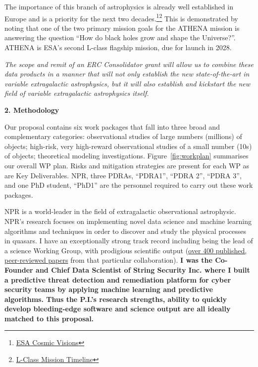 \documentclass[oneside, a4paper, onecolumn, 11pt]{article}
\begin{document}
\smallskip
\smallskip
\noindent
The importance of this branch of astrophysics is already well
established in Europe and is a priority for the next two
decades.\footnote{\href{http://sci.esa.int/cosmic-vision}{ESA Cosmic
Visions}}\footnote{\href{http://sci.esa.int/cosmic-vision/42369-l-class-timeline/}{L-Class
Mission Timeline}} This is demonstrated by noting that one of the two
primary mission goals for the ATHENA mission is answering the question
``How do black holes grow and shape the Universe?''.  ATHENA is ESA's
second L-class flagship mission, due for launch in 2028.

\smallskip
\smallskip
\noindent
{\it The scope and remit of an ERC Consolidator grant will allow us to
combine these data products in a manner that will not only establish
the new state-of-the-art in variable extragalactic astrophysics, but it 
will also establish and kickstart the new field of variable extragalactic
astrophysics itself.}




\medskip
\medskip
\noindent
\large
{\bf{\textcolor{Cerulean}{2. Methodology}}}
\normalsize

\noindent
Our proposal contains six work packages that fall into three broad and
complementary categories: observational studies of large numbers
(millions) of objects; high-risk, very high-reward observational
studies of a small number (10s) of objects; theoretical modeling
investigations. Figure~\ref{fig:workplan} summarises our overall WP
plan. Risks and mitigation strategies are present for each WP as are
Key Deliverables.  NPR, three PDRAs, ``PDRA1'', ``PDRA 2'', ``PDRA
3'', and one PhD student, ``PhD1'' are the personnel required to carry
out these work packages.


\smallskip
\smallskip
\noindent
NPR is a world-leader in the field of extragalactic observational
astrophysic. NPR's research focuses on implementing novel data
science and machine learning algorithms and techniques in order to
discover and study the physical processes in quasars. I have an
exceptionally strong track record including being the lead of a
science Working Group, with prodigious scientific output
(\href{https://tinyurl.com/ycxd8lb6}{over 400 published, peer-reviewed
papers} from that particular collaboration).
{\bf I was the Co-Founder and Chief Data Scientist of String Security
Inc. where I built a predictive threat detection and remediation
platform for cyber security teams by applying machine learning and
predictive algorithms.  Thus the P.I.'s research strengths, ability to
quickly develop bleeding-edge software and science output are all
ideally matched to this proposal.}
\end{document}
